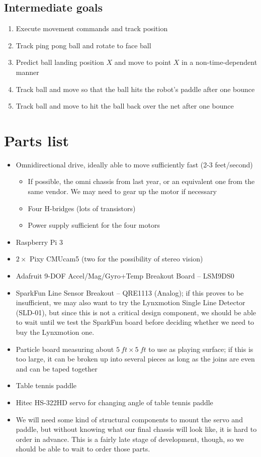 \documentclass[letterpaper, 11pt]{article}
\begin{document}
\subsection*{Intermediate goals}
\begin{enumerate}
    \item Execute movement commands and track position
    \item Track ping pong ball and rotate to face ball
    \item Predict ball landing position $X$ and move to point $X$ in a non-time-dependent manner
    \item Track ball and move so that the ball hits the robot's paddle after one bounce
    \item Track ball and move to hit the ball back over the net after one bounce
\end{enumerate}

\clearpage
\section{Parts list}
\begin{itemize}
    \item Omnidirectional drive, ideally able to move sufficiently fast (2-3 feet/second)
        \begin{itemize}
            \item If possible, the omni chassis from last year, or an equivalent one from the same vendor. We may need to gear up the motor if necessary
            \item Four H-bridges (lots of transistors)
            \item Power supply sufficient for the four motors
        \end{itemize}
    \item Raspberry Pi 3
    \item $2\times{}$ Pixy CMUcam5 (two for the possibility of stereo vision)
    \item Adafruit 9-DOF Accel/Mag/Gyro+Temp Breakout Board -- LSM9DS0
    \item SparkFun Line Sensor Breakout -- QRE1113 (Analog); if this proves to be insufficient, we may also want to try the Lynxmotion Single Line Detector (SLD-01), but since this is not a critical design component, we should be able to wait until we test the SparkFun board before deciding whether we need to buy the Lynxmotion one.
    \item Particle board measuring about $\SI{5}{ft}\times\SI{5}{ft}$ to use as playing surface; if this is too large, it can be broken up into several pieces as long as the joins are even and can be taped together
    \item Table tennis paddle
    \item Hitec HS-322HD servo for changing angle of table tennis paddle
    \item We will need some kind of structural components to mount the servo and paddle, but without knowing what our final chassis will look like, it is hard to order in advance. This is a fairly late stage of development, though, so we should be able to wait to order those parts.
\end{itemize}
\end{document}
